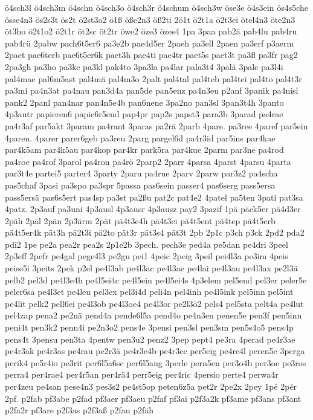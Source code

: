 {ö4sch3l
ö4sch3m
ö4schn
ö4sch3o
ö4sch3r
ö4schum
ö4sch3w
öse3e
ö4s3ein
ös4s5che
össe4n3
ös2s3t
ös2t
ö2st3a2
ö1ß
öße2n3
öß2ti
2ö1t
ö2t1a
ö2t3ei
ötel4n3
öte2n3
öt3ho
ö2t1o2
ö2t1r
öt2sc
öt2tr
öwe2
öze3
özes4
1pa
3paa
pab2ä
pab4lu
pab4ru
pab4rü
2pabw
pach6t5er6
pa3e2b
pae4d5er
2paeh
pa3ell
2paen
pa3erf
p3aerm
2paet
pae6terb
pae6t5er6k
paet3h
pae4ti
pae4tr
paet5s
paet3t
pa3fl
pa3fr
pag2
2pa3gh
pa3ho
pa3ke
pa3kl
pak4to
3pa3la
pa4lar
pala3t4
3palä
3pale
pa3l4i
pal4mae
pal6m5ast
pal4mä
pal4m3o
2palt
pal4tal
pal4teb
pal4tei
pal4to
pal4t3r
pa3mi
pa4n3at
pa4nau
pan3d4a
pan5de
pan5enz
pa4n3eu
p2anf
3panik
pa4nisl
pank2
2panl
pan4nar
pan4n5e4b
pan6nene
3pa2no
pan3sl
3pan3t4h
3panto
4p3antr
papieren6
papie6r5end
pap4pr
pap2s
papst3
para3b
3parad
pa4rae
pa4r3af
par5akt
3param
pa4rant
3paras
pa2rä
2parb
4pare.
pa3ree
4paref
par5ein
4paren.
4parer
parer6geb
pa3reu
2parg
pargel6d
pa4r3id
par5ins
par4kae
par4k5am
par4k5au
par4kop
par4kr
park5ra
par4kue
2parm
par3ne
pa4rod
pa4roe
pa4rof
3parol
pa4ron
pa4rö
2parp2
2parr
4parsa
4parst
4parsu
4parta
par3t4e
partei5
parter4
3party
2paru
pa4rue
2parv
2parw
par3z2
pa4scha
pas5chaf
3pasi
pa3spo
pa3spr
5passa
pas6sein
passer4
pas6serg
pass5ersa
pass5ersä
pas6s5ert
pas4sp
pa3st
pa2ßu
pat2c
pat4e2
4patel
pa5ten
3pati
pat3sa
4patz.
2p3auf
pa3uni
4p3ausl
4p3ausr
4p3ausz
pay2
3pazif
1pä
päck5er
pä4d3er
2päh
2päl
2pän
2p3ärm
2pät
pä4t3e4h
pä4t3ei
pä4t5ent
pä4tep
pä4t5erb
pä4t5er4k
pät3h
pä2t3i
pä2to
pät3r
pät3s4
pät3t
2pb
2p1c
p3ch
p3ck
2pd2
pda2
pdi2
1pe
pe2a
pea2r
pea2s
2p1e2b
3pech.
pech3e
ped4a
pe5dan
pe4dri
3peel
2p3eff
2pefr
pe4gal
pege4l3
pe2gn
pei1
4peic
2peig
3peil
pei4l3a
pe3im
4peis
peise5i
3peits
2pek
p2el
pe4l3ab
pe4l3ac
pe4l3ae
pe4lai
pe4l3au
pe4l3ax
pe2l3ä
pelb2
pel3d
pe4l3e4h
pe4l5ei4c
pe4l5ein
pe4l5ei4s
4p3elem
pel5end
pel3er
peler5e
peler6sa
pe4l3et
pe4leu
pel3ex
pel3i4d
peli4n
pel4inh
pe4l5ink
pel5inn
pel5int
pe4lit
pelk2
pell6ei
pe4l3ob
pe4l3oe4
pe4l3or
pe2l3ö2
pels4
pel5sta
pelt4a
pe4lut
pel4zap
pena2
pe2nä
pend4a
pende6l5a
pend4o
pe4n3en
penen5e
pen3f
pen5inn
peni4t
pen3k2
penn4i
pe2n3o2
pens4e
3pensi
pen3sl
pen3sm
pen5s4o5
pens4p
pens4t
3pensu
pen3ta
4pentw
pen3u2
penz2
3pep
pept4
pe3ra
4perad
pe4r3ae
pe4r3ak
pe4r3as
pe4rau
pe2r3ä
pe4r3e4b
pe4r3ec
per5eig
pe4re4l
peren5e
3perga
perik4
pe5r4io
pe3rit
per6l5a6sc
per6l5aug
3perle
pern5en
per3o4b
per3oe
pe3ros
perra4
per4rae4
per4r5an
per4rä4
perr5eig
per4ric
4persio
perte4
perwa4r
per4zeu
pe4san
pese4n3
pes3s2
pe4st5op
peten6z5a
pet2r
2pe2x
2pey
1pé
2pér
2pf.
p2fab
pf3abe
p2fad
pf3aer
pf3aeu
p2faf
pf3ai
p2f3a2k
pf3ame
pf3ans
pf3ant
p2fa2r
pf3are
p2f3as
p2f3aß
p2fau
p2fäh
}
